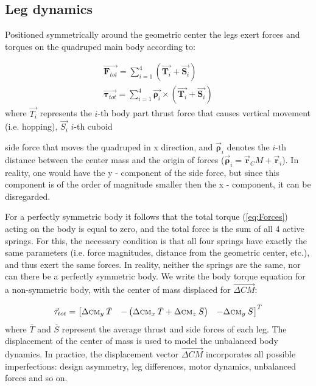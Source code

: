 \subsection{Leg dynamics}


Positioned symmetrically around the geometric center the legs exert forces and torques on the quadruped main body according to:

\begin{gather}\label{eq:Forces}
\vec{\textbf{F}_{tot}}=\sum_{i=1}^{4}(\vec{\textbf{T}_{i}}+\vec{\textbf{S}_{i}})\\
\vec{\boldsymbol{\tau}_{tot}}=\sum_{i=1}^{4}\vec{\boldsymbol{\rho} _i}\times(\vec{\textbf{T}_{i}}+\vec{\textbf{S}_{i}})
\end{gather}  
where $\vec{T_{i}}$ represents the $i$-th body part thrust force that causes vertical movement (i.e. hopping), $\vec{S_{i}}$ $i$-th cuboid 


side force that moves the quadruped in x direction, and $\vec{\mathbf{\rho}} _i$ denotes the $i$-th distance between the center mass and 
the origin of forces ($\vec{\mathbf{\rho}} _i=\vec{\textbf{r}} _CM+\vec{\textbf{r}} _i$). In reality, one would have the y - component of
the side force, but since this component is of the order of magnitude smaller then the x - component, it can be disregarded.

For a perfectly symmetric body it follows that the total torque (\ref{eq:Forces}) acting on the body is equal to zero, and the total force is the sum of all 4 active springs. For this, the necessary condition is that all four springs have exactly the same parameters (i.e. force magnitudes, distance from the geometric center, etc.), and thus exert the same forces. In reality, neither the springs are the same, nor can there be a perfectly symmetric body. We write the body torque equation for a non-symmetric body, with the center of mass displaced for $\vec{\Delta CM}$:

\begin{equation}\label{eq:Torques}
\vec{\tau}_{tot}=\begin{bmatrix}
\Delta \textsc{cm}_y \:\bar{T} & -\left ( \Delta \textsc{cm}_x \:\bar{T} +\Delta \textsc{cm}_z \:\bar{S}\right ) & -\Delta \textsc{cm}_y \:\bar{S}
\end{bmatrix}^T
\end{equation}
where $\bar{T}$ and $\bar{S}$ represent the average thrust and side forces of each leg. The displacement of the center of mass is used to model the unbalanced body dynamics. In practice, the displacement vector  $\vec{\Delta CM}$ incorporates all possible imperfections: design asymmetry, leg differences, motor dynamics, unbalanced  forces and so on.

